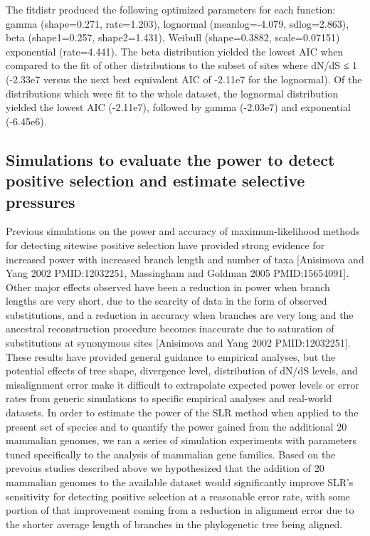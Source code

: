 The fitdistr produced the following optimized parameters for each
function: gamma (shape=0.271, rate=1.203), lognormal (meanlog=-4.079,
sdlog=2.863), beta (shape1=0.257, shape2=1.431), Weibull
(shape=0.3882, scale=0.07151) exponential (rate=4.441). The beta
distribution yielded the lowest AIC when compared to the fit of other
distributions to the subset of sites where dN/dS ≤ 1 (-2.33e7 versus
the next best equivalent AIC of -2.11e7 for the lognormal). Of the
distributions which were fit to the whole dataset, the lognormal
distribution yielded the lowest AIC (-2.11e7), followed by gamma
(-2.03e7) and exponential (-6.45e6).

\subsection{Simulations to evaluate the power to detect positive selection and estimate selective pressures}



Previous simulations on the power and accuracy of maximum-likelihood
methods for detecting sitewise positive selection have provided strong
evidence for increased power with increased branch length and number
of taxa [Anisimova and Yang 2002 PMID:12032251, Massingham and Goldman
  2005 PMID:15654091]. Other major effects observed have been a
reduction in power when branch lengths are very short, due to the
scarcity of data in the form of observed substitutions, and a
reduction in accuracy when branches are very long and the ancestral
reconstruction procedure becomes inaccurate due to saturation of
substitutions at synonymous sites [Anisimova and Yang 2002
  PMID:12032251]. These results have provided general guidance to
empirical analyses, but the potential effects of tree shape,
divergence level, distribution of dN/dS levels, and misalignment error
make it difficult to extrapolate expected power levels or error rates
from generic simulations to specific empirical analyses and real-world
datasets. In order to estimate the power of the SLR method when
applied to the present set of species and to quantify the power gained
from the additional 20 mammalian genomes, we ran a series of
simulation experiments with parameters tuned specifically to the
analysis of mammalian gene families. Based on the prevoius studies
described above we hypothesized that the addition of 20 mammalian
genomes to the available dataset would significantly improve SLR’s
sensitivity for detecting positive selection at a reasonable error
rate, with some portion of that improvement coming from a reduction in
alignment error due to the shorter average length of branches in the
phylogenetic tree being aligned.

